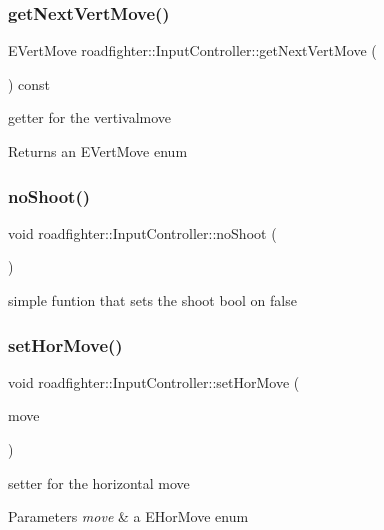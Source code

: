 \subsubsection{\texorpdfstring{get\+Next\+Vert\+Move()}{getNextVertMove()}}
{\footnotesize\ttfamily E\+Vert\+Move roadfighter\+::\+Input\+Controller\+::get\+Next\+Vert\+Move (\begin{DoxyParamCaption}{ }\end{DoxyParamCaption}) const}

getter for the vertivalmove \begin{DoxyReturn}{Returns}
an E\+Vert\+Move enum 
\end{DoxyReturn}
\mbox{\label{classroadfighter_1_1InputController_a0bc4209941f91c548673f85905fb3ead}} 
\subsubsection{\texorpdfstring{no\+Shoot()}{noShoot()}}
{\footnotesize\ttfamily void roadfighter\+::\+Input\+Controller\+::no\+Shoot (\begin{DoxyParamCaption}{ }\end{DoxyParamCaption})}

simple funtion that sets the shoot bool on false \mbox{\label{classroadfighter_1_1InputController_a1b1efa38b003c59f50dbafcd20d781e4}} 
\subsubsection{\texorpdfstring{set\+Hor\+Move()}{setHorMove()}}
{\footnotesize\ttfamily void roadfighter\+::\+Input\+Controller\+::set\+Hor\+Move (\begin{DoxyParamCaption}\item[{E\+Hor\+Move}]{move }\end{DoxyParamCaption})}

setter for the horizontal move 
\begin{DoxyParams}{Parameters}
{\em move} & a E\+Hor\+Move enum \\
\hline
\end{DoxyParams}
\mbox{\label{classroadfighter_1_1InputController_a729813bffe0b3180acc07ce54f6c7078}} 
